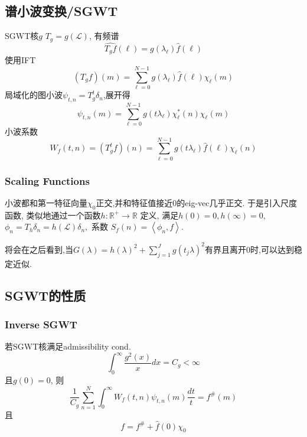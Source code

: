 \documentclass{article}
\begin{document}
\subsection{谱小波变换/SGWT}

    SGWT核$g$ \trarr $T_{g}=g(\mathcal{L})$, 有频谱
    \begin{equation}
        \widehat{T_{g} f}(\ell)=g\left(\lambda_{\ell}\right) \hat{f}(\ell)
    \end{equation}
    使用IFT
    \begin{equation}
        \left(T_{g} f\right)(m)=\sum_{\ell=0}^{N-1} g\left(\lambda_{\ell}\right) \hat{f}(\ell) \chi_{\ell}(m)
    \end{equation}
    局域化的图小波$\psi_{t, n}=T_{g}^{t} \delta_{n}$,展开得
    \begin{equation}
        \psi_{t, n}(m)=\sum_{\ell=0}^{N-1} g\left(t \lambda_{\ell}\right) \chi_{\ell}^{*}(n) \chi_{\ell}(m)
    \end{equation}
    小波系数
    \begin{equation}
        W_{f}(t, n)=\left(T_{g}^{t} f\right)(n)=\sum_{\ell=0}^{N-1} g\left(t \lambda_{\ell}\right) \hat{f}(\ell) \chi_{\ell}(n)
    \end{equation}

\subsubsection{Scaling Functions}
    小波都和第一特征向量$\chi_0$正交,并和特征值接近0的eig-vec几乎正交. 于是引入尺度函数, 类似地通过一个函数$h: \mathbb{R}^{+} \rightarrow \mathbb{R}$ 定义, 满足$h(0)=0, h(\infty)=0$, $\phi_{n}=T_{h} \delta_{n}=h(\mathcal{L}) \delta_{n},$ 系数 $S_{f}(n)=\left\langle\phi_{n}, f\right\rangle .$

    将会在之后看到,当$G(\lambda)=h(\lambda)^{2}+\sum_{j=1}^{J} g\left(t_{j} \lambda\right)^{2}$有界且离开0时,可以达到稳定近似.

\subsection{SGWT的性质}
\subsubsection{Inverse SGWT}
     若SGWT核满足admissibility cond.
    \begin{equation}
        \int_{0}^{\infty} \frac{g^{2}(x)}{x} d x=C_{g}<\infty
    \end{equation}
    且$g(0)=0$, 则
    \begin{equation}
        \frac{1}{C_{g}} \sum_{n=1}^{N} \int_{0}^{\infty} W_{f}(t, n) \psi_{t, n}(m) \frac{d t}{t}=f^{\#}(m)
    \end{equation}
    且
    \begin{equation}
        f=f^{\#}+\hat{f}(0) \chi_{0}
    \end{equation}
\end{document}
